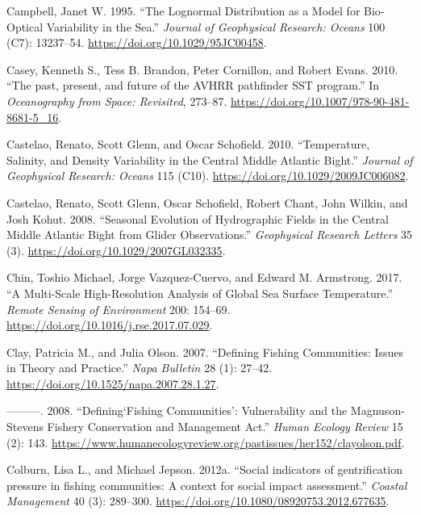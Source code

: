 \documentclass[
]{book}
\newlength{\cslhangindent}
\newenvironment{cslreferences}%
  {\setlength{\parindent}{0pt}%
  \everypar{\setlength{\hangindent}{\cslhangindent}}\ignorespaces}%
  {\par}
\begin{document}
\begin{cslreferences}
\leavevmode\hypertarget{ref-SOE2}{}%
Campbell, Janet W. 1995. ``The Lognormal Distribution as a Model for Bio-Optical Variability in the Sea.'' \emph{Journal of Geophysical Research: Oceans} 100 (C7): 13237--54. \url{https://doi.org/10.1029/95JC00458}.

\leavevmode\hypertarget{ref-Casey2010}{}%
Casey, Kenneth S., Tess B. Brandon, Peter Cornillon, and Robert Evans. 2010. ``The past, present, and future of the AVHRR pathfinder SST program.'' In \emph{Oceanography from Space: Revisited}, 273--87. \url{https://doi.org/10.1007/978-90-481-8681-5_16}.

\leavevmode\hypertarget{ref-castelao_temperature_2010}{}%
Castelao, Renato, Scott Glenn, and Oscar Schofield. 2010. ``Temperature, Salinity, and Density Variability in the Central Middle Atlantic Bight.'' \emph{Journal of Geophysical Research: Oceans} 115 (C10). \url{https://doi.org/10.1029/2009JC006082}.

\leavevmode\hypertarget{ref-castelao_seasonal_2008}{}%
Castelao, Renato, Scott Glenn, Oscar Schofield, Robert Chant, John Wilkin, and Josh Kohut. 2008. ``Seasonal Evolution of Hydrographic Fields in the Central Middle Atlantic Bight from Glider Observations.'' \emph{Geophysical Research Letters} 35 (3). \url{https://doi.org/10.1029/2007GL032335}.

\leavevmode\hypertarget{ref-SOE4}{}%
Chin, Toshio Michael, Jorge Vazquez-Cuervo, and Edward M. Armstrong. 2017. ``A Multi-Scale High-Resolution Analysis of Global Sea Surface Temperature.'' \emph{Remote Sensing of Environment} 200: 154--69. \url{https://doi.org/10.1016/j.rse.2017.07.029}.

\leavevmode\hypertarget{ref-clay_defining_2007}{}%
Clay, Patricia M., and Julia Olson. 2007. ``Defining Fishing Communities: Issues in Theory and Practice.'' \emph{Napa Bulletin} 28 (1): 27--42. \url{https://doi.org/10.1525/napa.2007.28.1.27}.

\leavevmode\hypertarget{ref-clay_definingfishing_2008}{}%
---------. 2008. ``Defining`Fishing Communities': Vulnerability and the Magnuson-Stevens Fishery Conservation and Management Act.'' \emph{Human Ecology Review} 15 (2): 143. \url{https://www.humanecologyreview.org/pastissues/her152/clayolson.pdf}.

\leavevmode\hypertarget{ref-colburn2012}{}%
Colburn, Lisa L., and Michael Jepson. 2012a. ``Social indicators of gentrification pressure in fishing communities: A context for social impact assessment.'' \emph{Coastal Management} 40 (3): 289--300. \url{https://doi.org/10.1080/08920753.2012.677635}.


\end{cslreferences}
\end{document}
